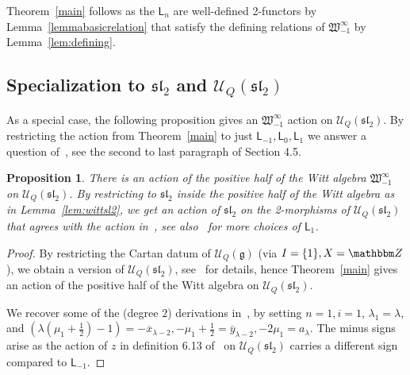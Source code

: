 \documentclass{amsart}
\numberwithin{equation}{section}
\newtheorem{proposition}[thm]{Proposition}
\theoremstyle{definition}
\def\Z{{\mathbbm Z}}
\newcommand{\Ucat}{\mathcal{U}_Q}
\newcommand{\witt}{{\mathfrak{W}}}
\newcommand{\LLn}[1][n]{{\mathsf{L}_{#1}}}
\newcommand{\ourwitt}{{\witt_{-1}^{\infty}}}
\begin{document}
Theorem~\ref{main} follows as the $\LLn$ are well-defined 2-functors by Lemma~\ref{lemmabasicrelation} that satisfy the defining relations of $\ourwitt$ by Lemma~\ref{lem:defining}. 


\subsection{Specialization to $\mathfrak{sl}_2$ and $\Ucat(\mathfrak{sl}_2)$}
As a special case, the following proposition gives an $\ourwitt$  action on $\Ucat(\mathfrak{sl}_2)$. By restricting the action from Theorem~\ref{main} to just $\LLn[-1], \LLn[0], \LLn[1]$ we answer a question of~\cite{qi2024symmetriesmathfrakglnfoams}, see the second to last paragraph of Section 4.5.

\begin{proposition}
There is an action of the positive half of the Witt algebra $\ourwitt$ on $\Ucat(\mathfrak{sl}_2)$.  By restricting to $\mathfrak{sl}_2$ inside the positive half of the Witt algebra as in Lemma~\ref{lem:wittsl2}, we get an action of $\mathfrak{sl}_2$ on the 2-morphisms of $\Ucat(\mathfrak{sl}_2)$ that agrees with the action in~\cite[Definition 6.13]{Elias_2023}, see also~\cite[Definition 4.6]{Elias_2016} for more choices of $\LLn[1]$.
\end{proposition}

\begin{proof}
    By restricting the Cartan datum of $\Ucat(\mathfrak{g})$ (via $I = \{1\}, X = \Z$), we obtain a version of $\Ucat(\mathfrak{sl}_2)$, see~\cite{Lau-param} for details, hence Theorem~\ref{main} gives an action of the positive half of the Witt algebra on $\Ucat(\mathfrak{sl}_2)$.

    We recover some of the (degree $2$) derivations in~\cite[Definition 4.6]{Elias_2016}, by setting $n =1, i = 1$, $\lambda_1 = \lambda$, and $(\lambda (\mu_1 + \frac{1}{2}) - 1) = -\overline{x}_{\lambda - 2},  - \mu_1 + \frac{1}{2} = \overline{y}_{\lambda - 2}, -2\mu_1 = a_{\lambda}$. The minus signs arise as the action of $z$ in definition 6.13 of~\cite{Elias_2023} on $\Ucat(\mathfrak{sl}_2)$ carries a different sign compared to $\LLn[-1]$.
\end{proof} 
\end{document}
